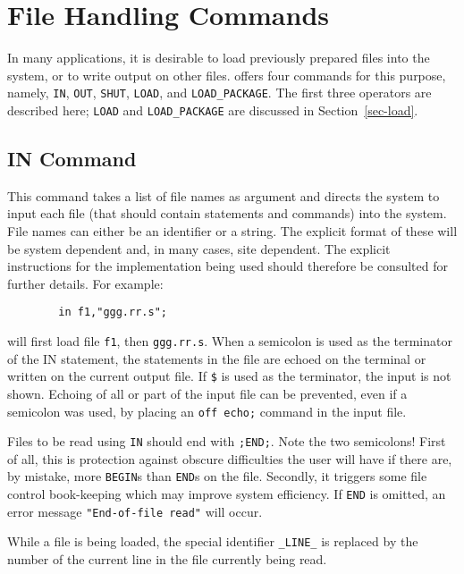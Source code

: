 \chapter{File Handling Commands}

In many applications, it is desirable to load previously prepared {\REDUCE}
files into the system, or to write output on other files. {\REDUCE} offers
four commands for this purpose, namely, \texttt{IN}, \texttt{OUT}, \texttt{SHUT},
\texttt{LOAD}, and \texttt{LOAD\_PACKAGE}.  The first
 three operators are described here; \texttt{LOAD} and 
\texttt{LOAD\_PACKAGE} are discussed in Section~\ref{sec-load}.

\section{IN Command}
\hypertarget{command:IN}{}
\hypertarget{switch:ECHO}{}
\hypertarget{reserved:_LINE_}{}
This command takes a list of file names as argument and directs the system
to input each file (that should contain {\REDUCE} statements
and commands) into the system.  File names can either be an identifier or
a string.  The explicit format of these will be system dependent and, in
many cases, site dependent.  The explicit instructions for the
implementation being used should therefore be consulted for further
details. For example:
\begin{verbatim}
        in f1,"ggg.rr.s";
\end{verbatim}
will first load file \texttt{f1}, then \texttt{ggg.rr.s}.  When a semicolon is
used as the terminator of the IN statement, the statements in the file are
echoed on the terminal or written on the current output file.  If \texttt{\$}
 is used as the terminator, the input is not
shown.  Echoing of all or part of the input file can be prevented, even if
a semicolon was used, by placing an \texttt{off echo;} command
in the input file.

Files to be read using \texttt{IN} should end with \texttt{;END;}.  Note the two
semicolons!  First of all, this is protection against obscure difficulties
the user will have if there are, by mistake, more \texttt{BEGIN}s than
\texttt{END}s on the file.  Secondly, it triggers some file control book-keeping
which may improve system efficiency.  If \texttt{END} is omitted, an error
message \texttt{"End-of-file read"} will occur.

While a file is being loaded, the special identifier 
\texttt{\_LINE\_}
is replaced by the number of the current line in the file currently
being read.

